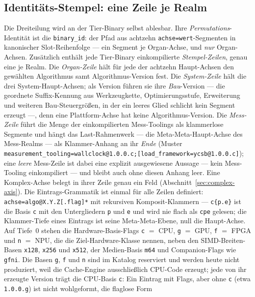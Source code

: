 \begin{nurlang}
\subsection{Identitäts-Stempel: eine Zeile je Realm}\label{sec:stamp-model}
Die Dreiteilung wird an der Tier-Binary selbst ablesbar. Ihre \emph{Permutations}-Identität ist die
\texttt{binary\_id}: der Pfad aus achtzehn \texttt{achse=wert}-Segmenten in kanonischer
Slot-Reihenfolge --- ein Segment je Organ-Achse, und \emph{nur} Organ-Achsen. Zusätzlich enthält jede
Tier-Binary einkompilierte \emph{Stempel-Zeilen}, genau eine je Realm. Die \emph{Organ-Zeile}
hält für jede der achtzehn Haupt-Achsen den gewählten Algorithmus samt Algorithmus-Version fest.
Die \emph{System-Zeile} hält die drei System-Haupt-Achsen; als Version führen sie ihre
\emph{Bau}-Version --- die geordnete Suffix-Kennung aus Werkzeugkette, Optimierungsstufe,
Erweiterung und weiteren Bau-Steuergrößen, in der ein leeres Glied schlicht kein Segment erzeugt
---, denn eine Plattform-Achse hat keine Algorithmus-Version. Die \emph{Mess-Zeile} führt die
Menge der einkompilierten Mess-Toolings als klammerlose Segmente und hängt das Last-Rahmenwerk ---
die Meta-Meta-Haupt-Achse des Mess-Realms --- als Klammer-Anhang an ihr \emph{Ende} (Muster
\texttt{measurement\_tooling=wallclock@1.0.0.c;\allowbreak{}[load\_framework=ycsb@1.0.0.c]}); eine
\emph{leere} Mess-Zeile ist dabei eine explizit ausgewiesene Aussage --- kein Mess-Tooling einkompiliert --- und
bleibt auch ohne diesen Anhang leer. Eine
Komplex-Achse belegt in ihrer Zeile genau ein Feld (Abschnitt~\ref{sec:complex-axis}). Die
Eintrags-Grammatik ist einmal für alle Zeilen definiert: \texttt{achse=algo@X.Y.Z[.flag]*} mit rekursiven
Komposit-Klammern --- \texttt{c\{p.e\}} ist die Basis \texttt{c} mit den Untergliedern \texttt{p} und
\texttt{e} und wird nie flach als \texttt{cpe} gelesen; die Klammer-Tiefe eines Eintrags ist seine
Meta-Meta-Ebene, null die Haupt-Achse. Auf Tiefe~0 stehen die Hardware-Basis-Flags \texttt{c} $=$ CPU, \texttt{g} $=$ GPU, \texttt{f} $=$ FPGA
und \texttt{n} $=$ NPU, die die Ziel-Hardware-Klasse nennen, neben den SIMD-Breiten-Basen \texttt{x128},
\texttt{x256} und \texttt{x512}, der Medien-Basis \texttt{m64} und Companion-Flags wie \texttt{gfni}. Die
Basen \texttt{g}, \texttt{f} und \texttt{n} sind im Katalog reserviert und werden heute nicht produziert, weil
die Cache-Engine ausschließlich CPU-Code erzeugt; jede von ihr erzeugte Version trägt die CPU-Basis \texttt{c}:
Ein Eintrag mit Flags, aber ohne \texttt{c} (etwa \texttt{1.0.0.g}) ist nicht wohlgeformt, die flaglose Form

\end{nurlang}
